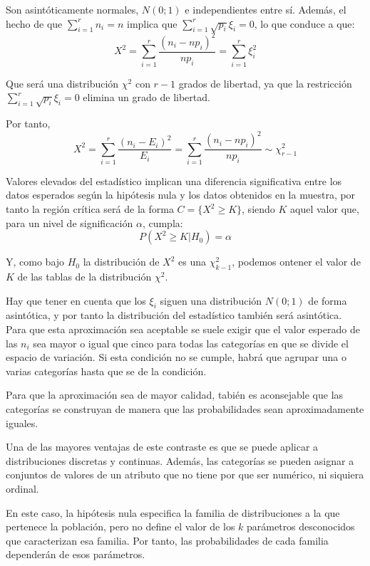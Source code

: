 Son asint\'oticamente normales, $N(0;1)$ e independientes entre s\'i. Adem\'as, el hecho de que $\sum_{i=1}^rn_i=n$ implica que $\sum_{i=1}^r\sqrt{p_i}\xi_i=0$, lo que conduce a que:
\[X^2=\sum_{i=1}^r\dfrac{(n_i-np_i)^2}{np_i}=\sum_{i=1}^r\xi_i^2\]

Que ser\'a una distribuci\'on $\chi^2$ con $r-1$ grados de libertad, ya que la restricci\'on $\sum_{i=1}^r\sqrt{p_i}\xi_i=0$ elimina un grado de libertad.

Por tanto,
\[X^2=\sum_{i=1}^r\dfrac{(n_i-E_i)^2}{E_i}=\sum_{i=1}^r\dfrac{(n_i-np_i)^2}{np_i}\sim\chi^2_{r-1}\]

Valores elevados del estad\'istico implican una diferencia significativa entre los datos esperados seg\'un la hip\'otesis nula y los datos obtenidos en la muestra, por tanto la regi\'on cr\'itica ser\'a de la forma $C=\{X^2\geq K\}$, siendo $K$ aquel valor que, para un nivel de significaci\'on $\alpha$, cumpla:
\[P(X^2\geq K|H_0)=\alpha\]

Y, como bajo $H_0$ la distribuci\'on de $X^2$ es una $\chi^2_{k-1}$, podemos ontener el valor de $K$ de las tablas de la distribuci\'on $\chi^2$.

Hay que tener en cuenta que los $\xi_i$ siguen una distribuci\'on $N(0;1)$ de forma asint\'otica, y por tanto la distribuci\'on del estad\'istico tambi\'en ser\'a asint\'otica. Para que esta aproximaci\'on sea aceptable se suele exigir que el valor esperado de las $n_i$ sea mayor o igual que cinco para todas las categor\'ias en que se divide el espacio de variaci\'on. Si esta condici\'on no se cumple, habr\'a que agrupar una o varias categor\'ias hasta que se de la condici\'on.

Para que la aproximaci\'on sea de mayor calidad, tabi\'en es aconsejable que las categor\'ias se construyan de manera que las probabilidades sean aproximadamente iguales.

Una de las mayores ventajas de este contraste es que se puede aplicar a distribuciones discretas y continuas. Adem\'as, las categor\'ias se pueden asignar a conjuntos de valores de un atributo que no tiene por que ser num\'erico, ni siquiera ordinal.


En este caso, la hip\'otesis nula especifica la familia de distribuciones a la que pertenece la poblaci\'on, pero no define el valor de los $k$ par\'ametros desconocidos que caracterizan esa familia. Por tanto, las probabilidades de cada familia depender\'an de esos par\'ametros.

